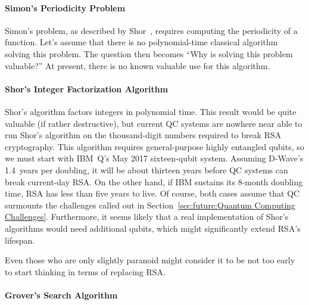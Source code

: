 \paragraph{Simon's Periodicity Problem}
\label{sec:future:Simon's Periodicity Problem}

Simon's problem, as described by
Shor~\cite{PeterWSchor2001QuantumAlgorithms},
requires computing the periodicity of a function.
Let's assume that there is no polynomial-time classical
algorithm solving this problem.
The question then becomes ``Why is solving this problem valuable?''
At present, there is no known valuable use for this algorithm.

\paragraph{Shor's Integer Factorization Algorithm}
\label{sec:future:Shor's Integer Factorization Algorithm}

Shor's algorithm factors integers in polynomial time.
This result would be quite valuable (if rather destructive),
but current QC systems are nowhere near able to run
Shor's algorithm on the thousand-digit numbers required
to break RSA cryptography.
This algorithm requires general-purpose highly entangled qubits,
so we must start with IBM~Q's May 2017 sixteen-qubit system.
Assuming D-Wave's 1.4~years per doubling, it will be about thirteen
years before QC systems can break current-day RSA.
On the other hand, if IBM sustains its 8-month doubling time, RSA has
less than five years to live.
Of course, both cases assume that QC surmounts the challenges called
out in Section~\ref{sec:future:Quantum Computing Challenges}.
Furthermore, it seems likely that a real implementation of Shor's
algorithms would need additional qubits, which might significantly extend
RSA's lifespan.

Even those who are only slightly paranoid might consider it to be not
too early to start thinking in terms of replacing RSA.

\paragraph{Grover's Search Algorithm}
\label{sec:future:Grover's Search Algorithm}

